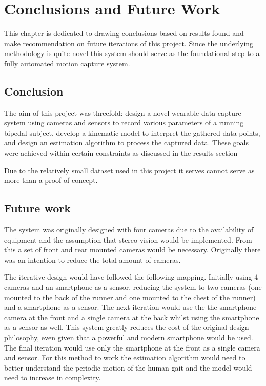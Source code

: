 \chapter{Conclusions and Future Work}
This chapter is dedicated to drawing conclusions based on results found and make recommendation on future iterations of this project. Since the underlying methodology is quite novel this system should serve as the foundational step to a fully automated motion capture system.

\section{Conclusion}
The aim of this project was threefold: design a novel wearable data capture system using cameras and sensors to record various parameters of a running bipedal subject, develop a kinematic model to interpret the gathered data points, and design an estimation algorithm to process the captured data. These goals were achieved within certain constraints as discussed in the results section

Due to the relatively small dataset used in this project it serves cannot serve  as more than a proof of concept.

\section{Future work}
The system was originally designed with four cameras due to the availability of equipment and the assumption that stereo vision would be implemented. From this a set of front and rear mounted cameras would be necessary. Originally there was an intention to reduce the total amount of cameras.

The iterative design would have followed the following mapping. Initially using 4 cameras and an smartphone as a sensor. reducing the system to two cameras (one mounted to the back of the runner and one mounted to the chest of the runner) and a smartphone as a sensor. The next iteration would use the the smartphone camera at the front and a single camera at the back whilst using the smartphone as a sensor as well. This system greatly reduces the cost of the original design philosophy, even given that a powerful and modern smartphone would be used. The final iteration would use only the smartphone at the front as a single camera and sensor. For this method to work the estimation algorithm would need to better understand the periodic motion of the human gait and the model would need to increase in complexity.

